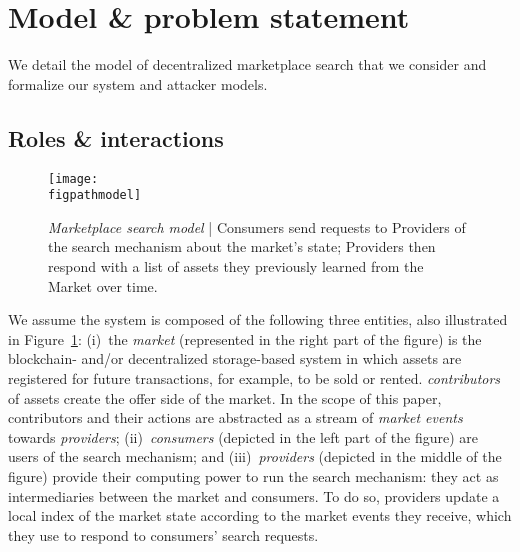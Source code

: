 \section{Model \& problem statement}\label{sec:problem_statement}

We detail the model of decentralized marketplace search that we consider and formalize our system and attacker models.



\subsection{Roles \& interactions}

\begin{figure}
    \centering
    \texttt{[image: \\figpathmodel]}
    \caption{\emph{Marketplace search model} | Consumers send requests to Providers of the search mechanism about the market's state; Providers then respond with a list of assets they previously learned from the Market over time.}\vspace{-0.5cm}
    \label{fig:system_model}
\end{figure}

We assume the system is composed of the following three entities, also illustrated in Figure~\ref{fig:system_model}: 
(i)~the \emph{market} (represented in the right part of the figure) is the blockchain- and/or decentralized storage-based system in which assets are registered for future transactions, for example, to be sold or rented. 
\emph{contributors} of assets create the offer side of the market. 
In the scope of this paper, contributors and their actions are abstracted as a stream of \emph{market events} towards \emph{providers}; 
(ii)~\emph{consumers} (depicted in the left part of the figure) are users of the search mechanism;
and (iii)~\emph{providers} (depicted in the middle of the figure) provide their computing power to run the search mechanism: 
they act as intermediaries between the market and consumers.
To do so, providers update a local index of the market state according to the market events they receive, which they use to respond to consumers' search requests.

